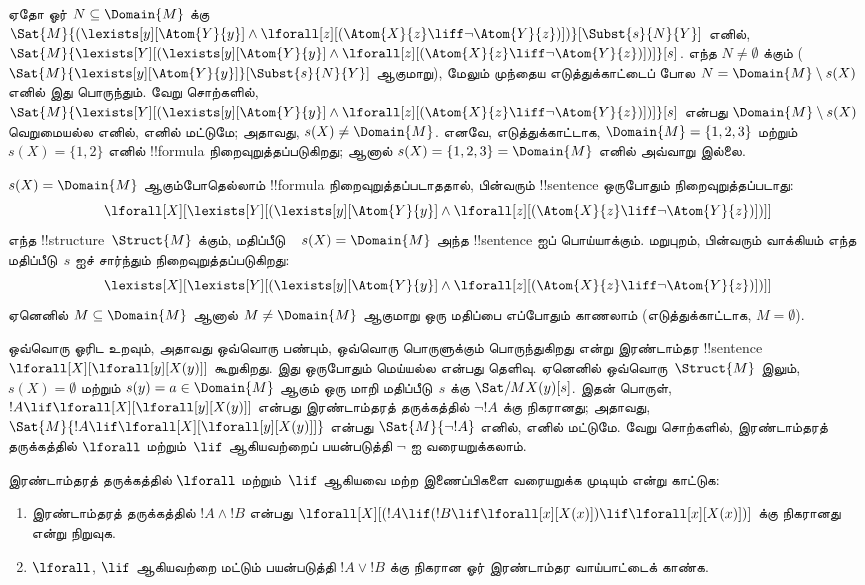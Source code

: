 \documentclass[../../../include/open-logic-section]{subfiles}
\begin{document}
\begin{ex}
  ஏதோ ஓர் $N \subseteq \Domain{M}$ க்கு
  $\Sat{M}{(\lexists[y][\Atom{Y}{y}] \land \lforall[z][(\Atom{X}{z}
  \liff \lnot \Atom{Y}{z})])}[\Subst{s}{N}{Y}]$ எனில்,
  $\Sat{M}{\lexists[Y][(\lexists[y][\Atom{Y}{y}] \land
  \lforall[z][(\Atom{X}{z} \liff \lnot \Atom{Y}{z})])]}[s]$.
  எந்த $N \neq \emptyset$ க்கும்
  ($\Sat{M}{\lexists[y][\Atom{Y}{y}]}[\Subst{s}{N}{Y}]$ ஆகுமாறு),
  மேலும் முந்தைய எடுத்துக்காட்டைப் போல
  $N = \Domain{M} \setminus s(X)$ எனில் இது பொருந்தும்.
  வேறு சொற்களில்,
  $\Sat{M}{\lexists[Y][(\lexists[y][\Atom{Y}{y}] \land
  \lforall[z][(\Atom{X}{z} \liff \lnot \Atom{Y}{z})])]}[s]$ என்பது
  $\Domain{M} \setminus s(X)$ வெறுமையல்ல எனில், எனில் மட்டுமே;
  அதாவது, $s(X) \neq \Domain{M}$. எனவே, எடுத்துக்காட்டாக,
  $\Domain{M} = \{1, 2, 3\}$ மற்றும் $s(X) = \{1, 2\}$ எனில்
  !!{formula} நிறைவுறுத்தப்படுகிறது; ஆனால்
  $s(X) = \{1, 2, 3\} = \Domain{M}$ எனில் அவ்வாறு இல்லை.

  $s(X) = \Domain{M}$ ஆகும்போதெல்லாம் !!{formula}
  நிறைவுறுத்தப்படாததால், பின்வரும் !!{sentence} ஒருபோதும்
  நிறைவுறுத்தப்படாது:
  \[
  \lforall[X][\lexists[Y][(\lexists[y][\Atom{Y}{y}] \land
      \lforall[z][(\Atom{X}{z} \liff \lnot \Atom{Y}{z})])]]
  \]
  எந்த !!{structure}~$\Struct{M}$ க்கும், மதிப்பீடு
  ~ $s(X) = \Domain{M}$ அந்த !!{sentence} ஐப் பொய்யாக்கும்.
  மறுபுறம், பின்வரும் வாக்கியம் எந்த மதிப்பீடு~$s$ ஐச் சார்ந்தும்
  நிறைவுறுத்தப்படுகிறது:
  \[
  \lexists[X][\lexists[Y][(\lexists[y][\Atom{Y}{y}] \land
      \lforall[z][(\Atom{X}{z} \liff \lnot \Atom{Y}{z})])]]
  \]
  ஏனெனில் $M \subseteq \Domain{M}$ ஆனால்
  $M \neq \Domain{M}$ ஆகுமாறு ஒரு மதிப்பை எப்போதும் காணலாம்
  (எடுத்துக்காட்டாக, $M = \emptyset$).
\end{ex}

\begin{ex}
  ஒவ்வொரு ஓரிட உறவும், அதாவது ஒவ்வொரு பண்பும், ஒவ்வொரு பொருளுக்கும்
  பொருந்துகிறது என்று இரண்டாம்தர !!{sentence}
  ~$\lforall[X][\lforall[y][X(y)]]$ கூறுகிறது. இது ஒருபோதும்
  மெய்யல்ல என்பது தெளிவு. ஏனெனில் ஒவ்வொரு~$\Struct{M}$ இலும்,
  $s(X) = \emptyset$ மற்றும் $s(y) = a \in \Domain{M}$ ஆகும் ஒரு
  மாறி மதிப்பீடு~$s$ க்கு $\Sat/{M}{X(y)}[s]$.
  இதன் பொருள், $!A \lif \lforall[X][\lforall[y][X(y)]]$ என்பது
  இரண்டாம்தரத் தருக்கத்தில் $\lnot !A$ க்கு நிகரானது; அதாவது,
  $\Sat{M}{!A \lif
  \lforall[X][\lforall[y][X(y)]]}$ என்பது $\Sat{M}{\lnot !A}$ எனில்,
  எனில் மட்டுமே. வேறு சொற்களில், இரண்டாம்தரத் தருக்கத்தில்
  $\lforall$ மற்றும்~$\lif$ ஆகியவற்றைப் பயன்படுத்தி $\lnot$ ஐ
  வரையறுக்கலாம்.
\end{ex}

\begin{prob}
  இரண்டாம்தரத் தருக்கத்தில் $\lforall$ மற்றும்~$\lif$ ஆகியவை மற்ற
  இணைப்பிகளை வரையறுக்க முடியும் என்று காட்டுக:
  \begin{enumerate}
    \item இரண்டாம்தரத் தருக்கத்தில் $!A \land !B$ என்பது
    $\lforall[X][(!A \lif (!B \lif \lforall[x][X(x)])\lif
    \lforall[x][X(x)])]$ க்கு நிகரானது என்று நிறுவுக.
    \item $\lforall$, $\lif$ ஆகியவற்றை மட்டும் பயன்படுத்தி
    $!A \lor !B$ க்கு நிகரான ஓர் இரண்டாம்தர வாய்பாட்டைக் காண்க.
  \end{enumerate}
\end{prob}
\end{document}
